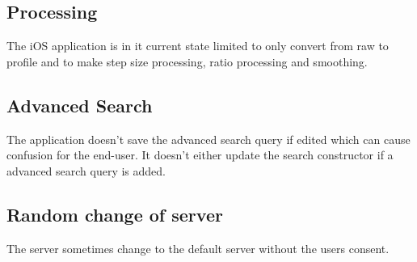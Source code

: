 


\subsection{Processing}
The iOS application is in it current state limited to only convert from raw to profile and to make step size processing, ratio processing and smoothing. 

\subsection{Advanced Search}
The application doesn't save the advanced search query if edited which can cause confusion for the end-user. It doesn't either update the search constructor if a advanced search query is added.  

\subsection{Random change of server}
The server sometimes change to the default server without the users consent. 
